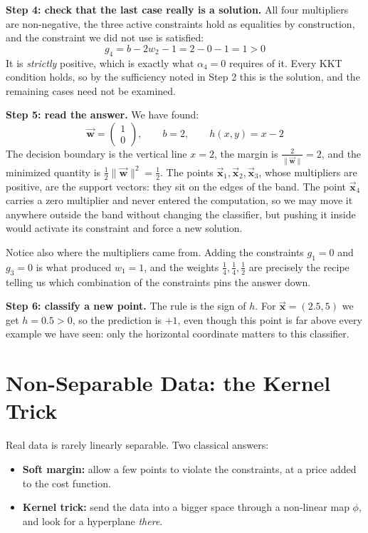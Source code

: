 \documentclass[]{article}
\newcommand{\vecx}{ \vec{\mathbf{x}} }
\newcommand{\vecw}{ \vec{\mathbf{w}} }
\begin{document}
	\noindent \textbf{Step 4: check that the last case really is a solution.}
	All four multipliers are non-negative, the three active constraints hold as equalities by construction, and the constraint we did not use is satisfied:
	$$
	g_4 = b - 2 w_2 - 1 = 2 - 0 - 1 = 1 > 0
	$$
	It is \textit{strictly} positive, which is exactly what $\alpha_4 = 0$ requires of it.
	Every KKT condition holds, so by the sufficiency noted in Step 2 this is the solution, and the remaining cases need not be examined.

	\noindent \textbf{Step 5: read the answer.}
	We have found:
	$$
	\vecw = \begin{pmatrix} 1 \\ 0 \end{pmatrix},
	\qquad
	b = 2,
	\qquad
	h(x,y) = x - 2
	$$
	The decision boundary is the vertical line $x = 2$, the margin is $\frac{2}{\|\vecw\|} = 2$, and the minimized quantity is $\frac{1}{2}\|\vecw\|^2 = \frac{1}{2}$.
	The points $\vecx_1, \vecx_2, \vecx_3$, whose multipliers are positive, are the support vectors: they sit on the edges of the band.
	The point $\vecx_4$ carries a zero multiplier and never entered the computation, so we may move it anywhere outside the band without changing the classifier, but pushing it inside would activate its constraint and force a new solution.

	Notice also where the multipliers came from.
	Adding the constraints $g_1 = 0$ and $g_3 = 0$ is what produced $w_1 = 1$, and the weights $\frac{1}{4}, \frac{1}{4}, \frac{1}{2}$ are precisely the recipe telling us which combination of the constraints pins the answer down.

	\noindent \textbf{Step 6: classify a new point.}
	The rule is the sign of $h$.
	For $\vecx = (2.5, 5)$ we get $h = 0.5 > 0$, so the prediction is $+1$, even though this point is far above every example we have seen: only the horizontal coordinate matters to this classifier.

	\section{Non-Separable Data: the Kernel Trick}

	Real data is rarely linearly separable.
	Two classical answers:
	\begin{itemize}
		\item \textbf{Soft margin:} allow a few points to violate the constraints, at a price added to the cost function.
		\item \textbf{Kernel trick:} send the data into a bigger space through a non-linear map $\phi$, and look for a hyperplane \textit{there}.
	\end{itemize}
\end{document}
